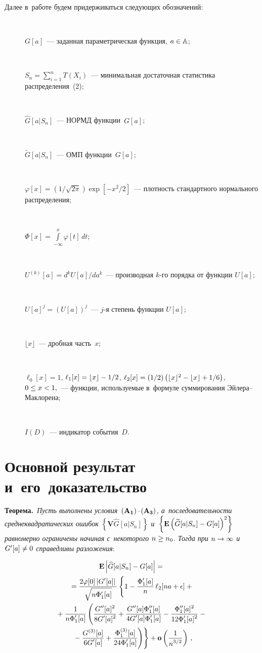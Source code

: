 \begin{multicols}{2}
  Далее в~работе будем придерживаться сле\-ду\-ющих обозначений:
  \begin{description}
\item[\,] $G[a]$~--- заданная параметрическая функция, $a\hm\in {\mathbb A}$;
\item[\,]
 $S_n=\sum\limits_{i=1}^n T(X_i)$~--- минимальная достаточная статистика распределения~(2);
 \item[\,]
 $\widehat{G}[a|S_n]$~--- НОРМД функции~$G[a]$;
\item[\,]
 $\widetilde{G}[a|S_n]$~--- ОМП функции~$G[a]$;
\item[\,]
 $\varphi[x]=({1}/{\sqrt{2\pi}})\exp\left[-x^2/2\right]$~--- 
 плот\-ность стандартного нормального распределения;
 \item[\,]
 $\Phi[x]=\int\limits_{-\infty}^x \varphi[t]\, dt$;
 \item[\,]
 $U^{(k)}[a]={d^k U[a]}/{da^k}$~--- производная $k$-го порядка от функции $U[a]$;
 \item[\,]
 $U[a]^j=(U[a])^j$~--- $j$-я степень функции $U[a]$;
 \item[\,]
 $\lfloor x \rfloor$~--- дробная часть~$x$;
 \item[\,]
 $\ell_0[x]=1$, $\ell_1[x]\hm=\lfloor x \rfloor\hm-{1}/{2}$,
$\ell_2[x]\hm=({1}/{2})\left(\lfloor x \rfloor^2\hm-\lfloor x \rfloor\hm+1/6\right)$,
 $0\hm\le x \hm< 1,$~--- функции, используемые в~формуле суммирования 
 Эй\-ле\-ра--Мак\-ло\-рена;
\item[\,]
 $I(D)$~--- индикатор события~$D$.
 \end{description}


\section{Основной результат и~его~доказательство}


  \noindent
  \textbf{Теорема.}\ \textit{Пусть выполнены условия~${\bf (A_1)}$--${\bf(A_3)}$, 
  а~последовательности среднеквадратических ошибок 
  $\left\{\mathbf{V} \widehat{G}[a|S_n]\right\}$ 
  и~$\left\{\mathbf{E} \left(\widetilde{G}[a|S_n]\hm-G[a]\right)^2\right\}$ 
  равномерно ограничены   начиная с~некоторого $n\hm\ge n_0$.
  Тогда при $n \hm\to \infty$ и~$G'[a]\hm\neq 0$ справедливы разложения}:
  
\noindent
   \begin{multline}
\mathbf{E} \left|\widehat{G}[a|S_n]-G[a]\right|={}\\
{}=
  \fr{2\varphi[0]\left|G'[a]\right|}{\sqrt{n\Phi_1 '[a]}}
   \left\{
   \vphantom{\fr{G^{(3)}[a]}{6 G'[a]}
  +\fr{\Phi_1^{(3)}[a]}{24 \Phi_1'[a]}}
   1-\fr{\Phi_1 '[a]}{n}\,\ell_2[na+\epsilon]
  +{}\right.
\\
{}  +\fr{1}{n\Phi_1'[a]}\left(
\vphantom{\fr{G^{(3)}[a]}{6 G'[a]}
  +\fr{\Phi_1^{(3)}[a]}{24 \Phi_1'[a]}}
  \fr{G''[a]^2}{8 G'[a]^2}
  +\fr{G''[a] \Phi_1''[a]}{4 G'[a] \Phi_1'[a]}
  -\fr{\Phi_1''[a]^2}{12\Phi_1'[a]^2}-{}\right.\\
\left.\left.  {}  -\fr{G^{(3)}[a]}{6 G'[a]}
  +\fr{\Phi_1^{(3)}[a]}{24 \Phi_1'[a]}\right)\right\}+
  \mathbf{o}\left(\fr{1}{n^{3/2}}\right)\,,
\label{e3-ch}
  \end{multline}
  

\end{multicols}
